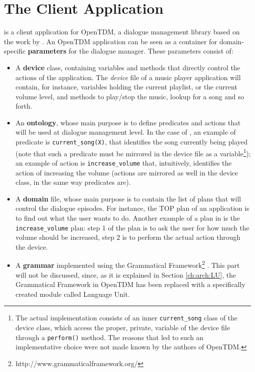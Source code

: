 \section{The Client Application} \label{ch:arch:client}
\pname is a client application for OpenTDM, a dialogue management library based on the work by \cite{Larsson02issue-baseddialogue}. An OpenTDM application can be seen as a container for domain-specific \textbf{parameters} for the dialogue manager. These parameters consist of:
\begin{itemize}
\item A \textbf{device} class, containing variables and methods that directly control the actions of the application. The \textit{device} file of a music player application will contain, for instance, variables holding the current playlist, or the current volume level, and methods to play/stop the music, lookup for a song and so forth.
\item An \textbf{ontology}, whose main purpose is to define predicates and actions that will be used at dialogue management level. In the case of \pname, an example of predicate is \texttt{current\_song(X)}, that identifies the song currently being played (note that such a predicate must be mirrored in the device file as a variable\footnote{The actual implementation consists of an inner \texttt{current\_song} class of the device class, which access the proper, private, variable of the device file through a \texttt{perform()} method. The reasons that led to such an implementative choice were not made known by the authors of OpenTDM.}); an example of action is \texttt{increase\_volume} that, intuitively, identifies the action of increasing the volume (actions are mirrored as well in the device class, in the same way predicates are).
\item A \textbf{domain} file, whose main purpose is to contain the list of plans that will control the dialogue episodes. For instance, the TOP plan of an application is to find out what the user wants to do. Another example of a plan in \pname is the \texttt{increase\_volume} plan: step 1 of the plan is to ask the user for how much the volume should be increased, step 2 is to perform the actual action through the device.
\item A \textbf{grammar} implemented using the Grammatical Framework\footnote{http://www.grammaticalframework.org/} \citep{citeulike:346448}. This part will not be discussed, since, as it is explained in Section \ref{ch:arch:LU}, the Grammatical Framework in OpenTDM has been replaced with a specifically created module called Language Unit.
\end{itemize}

